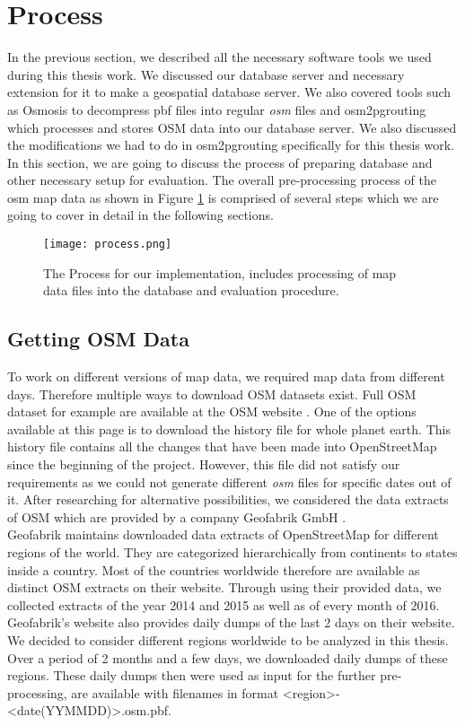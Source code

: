 \section{Process} \label{process}
In the previous section, we described all the necessary software tools we used during this thesis work. We discussed our database server and necessary extension for it to make a geospatial database server. We also covered tools such as Osmosis to decompress pbf files into regular \textit{osm} files and osm2pgrouting which processes and stores OSM data into our database server. We also discussed the modifications we had to do in osm2pgrouting specifically for this thesis work. In this section, we are going to discuss the process of preparing database and other necessary setup for evaluation. The overall pre-processing process of the osm map data as shown in Figure \ref{fg:process} is comprised of several steps which we are going to cover in detail in the following sections. 

\begin{figure}
\centering
\texttt{[image: process.png]}
\caption{The Process for our implementation, includes processing of map data files into the database and evaluation procedure.}
\label{fg:process}
\end{figure}

\subsection{Getting OSM Data}\label{data}
To work on different versions of map data, we required map data from different days. Therefore multiple ways to download OSM datasets exist. Full OSM dataset for example are available at the OSM website \cite{planetosm}. One of the options available at this page is to download the history file for whole planet earth. This history file contains all the changes that have been made into OpenStreetMap since the beginning of the project. However, this file did not satisfy our requirements as we could not generate different \textit{osm} files for specific dates out of it. After researching for alternative possibilities, we considered the data extracts of OSM which are provided by a company Geofabrik GmbH \cite{geofabrik}. \\

Geofabrik \cite{geofabrik} maintains downloaded data extracts of OpenStreetMap for different regions of the world. They are categorized hierarchically from continents to states inside a country. Most of the countries worldwide therefore are available as distinct OSM extracts on their website. Through using their provided data, we collected extracts of the year 2014 and 2015 as well as of every month of 2016. Geofabrik's website also provides daily dumps of the last 2 days on their website. We decided to consider different regions worldwide to be analyzed in this thesis. Over a period of 2 months and a few days, we downloaded daily dumps of these regions. These daily dumps then were used as input for the further pre-processing, are available with filenames in format <region>-<date(YYMMDD)>.osm.pbf.

